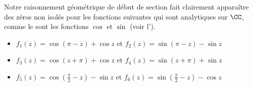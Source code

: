 
\begin{example}
    Notre raisonnement géométrique de début de section fait clairement apparaître des zéros non isolés pour les fonctions suivantes qui sont analytiques sur $\CC$, comme le sont les fonctions $\cos$ et $\sin$ (voir l').
    \begin{itemize}[label=\small\textbullet]
    	\item $f_1(z) = \cos (\pi - z) + \cos z$ 
    	   et $f_2(z) = \sin (\pi - z) - \sin z$ 
    
    	\smallskip
    	\item $f_3(z) =\cos (z + \pi) + \cos z$ 
    	   et $f_4(z) =\sin (z + \pi) + \sin z$
    
    	\smallskip
    	\item $f_5(z) =\cos \left( \frac{\pi}{2} - z \right) - \sin z$ 
    	   et $f_6(z) =\sin \left( \frac{\pi}{2} - z \right) - \cos z$ 
    \end{itemize}
\end{example}




